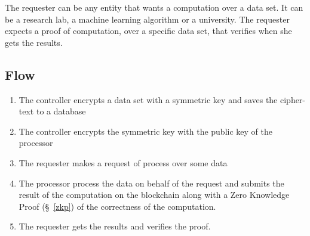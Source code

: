 The requester can be any entity that wants a computation over a data set. It can be a research lab, a machine learning
algorithm or a university. The requester expects a proof of computation, over a specific data set, that verifies when she
gets the results.

\subsection{Flow}

\begin{enumerate}
  \item The controller encrypts a data set with a symmetric key and saves the cipher-text to a database
  \item The controller encrypts the symmetric key with the public key of the processor
  \item The requester makes a request of process over some data
  \item The processor process the data on behalf of the request and submits the result of the computation on the
  blockchain along with a Zero Knowledge Proof (§~\ref{zkp}) of the correctness of the computation.
  \item The requester gets the results and verifies the proof.
\end{enumerate}

